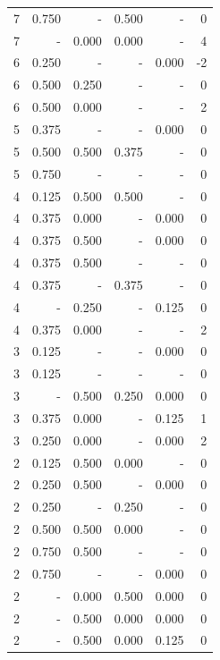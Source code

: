 \documentclass[a4paper]{article}\usepackage[]{graphicx}\usepackage[]{color}
\begin{document}
\begin{table}[ht]
\begin{tabular}{rrrrrr}
   \rowcolor{sosoColor} 7 & 0.750 & - & 0.500 & - & 0 \\ 
   \rowcolor{goodColor} 7 & - & 0.000 & 0.000 & - & 4 \\ 
   \rowcolor{nullColor} 6 & 0.250 & - & - & 0.000 & -2 \\ 
  6 & 0.500 & 0.250 & - & - & 0 \\ 
  6 & 0.500 & 0.000 & - & - & 2 \\ 
   \rowcolor{nullColor} 5 & 0.375 & - & - & 0.000 & 0 \\ 
  5 & 0.500 & 0.500 & 0.375 & - & 0 \\ 
   \rowcolor{nullColor} 5 & 0.750 & - & - & - & 0 \\ 
   \rowcolor{goodColor} 4 & 0.125 & 0.500 & 0.500 & - & 0 \\ 
  4 & 0.375 & 0.000 & - & 0.000 & 0 \\ 
  4 & 0.375 & 0.500 & - & 0.000 & 0 \\ 
  4 & 0.375 & 0.500 & - & - & 0 \\ 
   \rowcolor{sosoColor} 4 & 0.375 & - & 0.375 & - & 0 \\ 
  4 & - & 0.250 & - & 0.125 & 0 \\ 
  4 & 0.375 & 0.000 & - & - & 2 \\ 
   \rowcolor{nullColor} 3 & 0.125 & - & - & 0.000 & 0 \\ 
   \rowcolor{nullColor} 3 & 0.125 & - & - & - & 0 \\ 
   \rowcolor{badColor} 3 & - & 0.500 & 0.250 & 0.000 & 0 \\ 
  3 & 0.375 & 0.000 & - & 0.125 & 1 \\ 
  3 & 0.250 & 0.000 & - & 0.000 & 2 \\ 
   \rowcolor{badColor} 2 & 0.125 & 0.500 & 0.000 & - & 0 \\ 
  2 & 0.250 & 0.500 & - & 0.000 & 0 \\ 
   \rowcolor{sosoColor} 2 & 0.250 & - & 0.250 & - & 0 \\ 
   \rowcolor{badColor} 2 & 0.500 & 0.500 & 0.000 & - & 0 \\ 
  2 & 0.750 & 0.500 & - & - & 0 \\ 
   \rowcolor{nullColor} 2 & 0.750 & - & - & 0.000 & 0 \\ 
   \rowcolor{badColor} 2 & - & 0.000 & 0.500 & 0.000 & 0 \\ 
   \rowcolor{badColor} 2 & - & 0.500 & 0.000 & 0.000 & 0 \\ 
   \rowcolor{badColor} 2 & - & 0.500 & 0.000 & 0.125 & 0 \\ 

\end{tabular}
\end{table}
\end{document}
